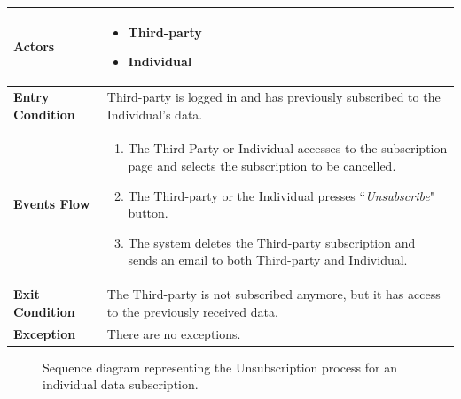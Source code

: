             \begin{table}[H]
            	\centering
                
                \begin{tabular}{|p{3cm}|p{8.2cm}|}
                    \hline
                    \textbf{Actors} &  \begin{itemize}
                                            \item Third-party
                                            \item Individual
                                        \end{itemize}\\
                     \hline
                    \textbf{Entry Condition} & Third-party is logged in and has previously subscribed to the Individual's data.\\
                     \hline
                    \textbf{Events Flow} & \begin{enumerate}
                                                \item The Third-Party or Individual accesses to the subscription page and selects the subscription to be cancelled.
                                                \item The Third-party or the Individual presses ``\emph{Unsubscribe}" button.
                                                \item The system deletes the Third-party subscription and sends an email to both Third-party and Individual.
                                            \end{enumerate}\\
                     \hline
                    \textbf{Exit Condition} & The Third-party is not subscribed anymore, but it has access to the previously received data. \\
                     \hline
                    \textbf{Exception} & There are no exceptions. \\
                     \hline
                \end{tabular}  
            \end{table} 
            
            \begin{figure}[H]
                \centering
                \caption{Sequence diagram representing the Unsubscription process for an individual data subscription.}
                \label{fig:Individual-request-unsubscription-process-sequence-diagram}
            \end{figure}    
            

